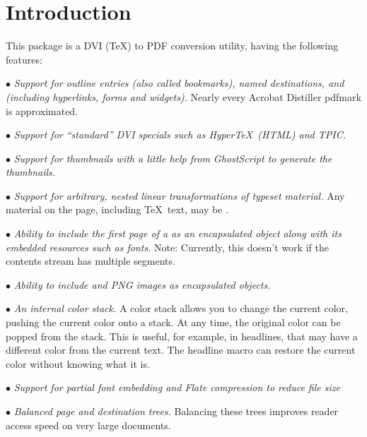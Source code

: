 \section{Introduction}
This package is a DVI (\TeX) to PDF conversion utility,
having the following features:

\beginlist
\item{$\bullet$} {\it Support for outline entries (also called bookmarks), named destinations,
and  (including hyperlinks, forms and widgets).}  Nearly
every Acrobat Distiller pdfmark is approximated.

\item{$\bullet$} {\it Support for ``standard'' DVI specials such
as Hyper\TeX\ (HTML) and TPIC.}

\item{$\bullet$} {\it Support for thumbnails with a little help from GhostScript to
generate the thumbnails.}

\item{$\bullet$} {\it Support for arbitrary, nested linear transformations
of typeset material.}  Any material on the page, including
\TeX\ text, may be   .

\item{$\bullet$} {\it Ability to include the first page of a  as
an encapsulated object along with its embedded resources such as fonts.}
Note:  Currently, this doesn't work if the contents stream
has multiple segments. 

\item{$\bullet$} {\it Ability to include  and
PNG images as encapsulated objects.}

\item{$\bullet$} {\it An internal color stack.} A color stack allows you to change the current color, pushing the
current color onto a stack.  At any time, the original color
can be popped from the stack.  This is useful, for example, in
headlines, that may have a different color from the current text.
The headline macro can restore the current color without knowing
what it is.

\item{$\bullet$} {\it Support for partial font embedding and Flate compression
to reduce file size}

\item{$\bullet$} {\it Balanced page and destination trees.} Balancing
these trees improves reader access speed 
on very large documents.

